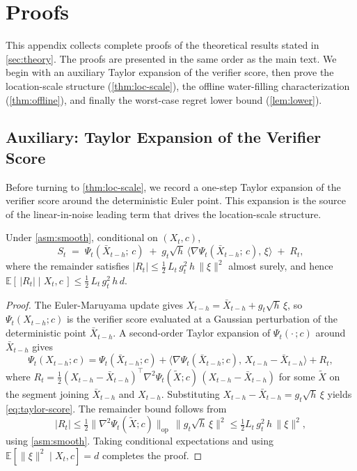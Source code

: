 \section{Proofs}
\label{sec:proofs}
%
This appendix collects complete proofs of the theoretical results stated in \cref{sec:theory}. The proofs are presented in the same order as the main text. We begin with an auxiliary Taylor expansion of the verifier score, then prove the location-scale structure (\cref{thm:loc-scale}), the offline water-filling characterization (\cref{thm:offline}), and finally the worst-case regret lower bound (\cref{lem:lower}).
%
\subsection{Auxiliary: Taylor Expansion of the Verifier Score}
\label{sec:proof-taylor}
%
Before turning to \cref{thm:loc-scale}, we record a one-step Taylor expansion of the verifier score around the deterministic Euler point. This expansion is the source of the linear-in-noise leading term that drives the location-scale structure.
%
\begin{proposition}
\label{prop:taylor}
Under \cref{asm:smooth}, conditional on $(X_t, c)$,
\begin{equation}
  S_t \;=\; \Psi_t(\bar{X}_{t-h};\, c)
        \;+\; g_t\sqrt{h}\,\bigl\langle \nabla\Psi_t(\bar{X}_{t-h};\, c),\, \xi \bigr\rangle
        \;+\; R_t,
  \label{eq:taylor-score}
\end{equation}
where the remainder satisfies $|R_t| \le \tfrac{1}{2}\,L_t\,g_t^2\,h\,\|\xi\|^2$ almost surely, and hence $\mathbb{E}[\,|R_t|\mid X_t, c\,] \le \tfrac{1}{2}\,L_t\,g_t^2\,h\,d$.
\end{proposition}
%
\begin{proof}
The Euler-Maruyama update gives $X_{t-h} = \bar{X}_{t-h} + g_t\sqrt{h}\,\xi$, so $\Psi_t(X_{t-h}; c)$ is the verifier score evaluated at a Gaussian perturbation of the deterministic point $\bar{X}_{t-h}$. A second-order Taylor expansion of $\Psi_t(\cdot\,; c)$ around $\bar{X}_{t-h}$ gives
\[
  \Psi_t(X_{t-h}; c) = \Psi_t(\bar{X}_{t-h}; c) + \bigl\langle \nabla\Psi_t(\bar{X}_{t-h}; c),\, X_{t-h} - \bar{X}_{t-h} \bigr\rangle + R_t,
\]
where $R_t = \tfrac{1}{2}(X_{t-h} - \bar{X}_{t-h})^\top \nabla^2\Psi_t(\widetilde{X}; c)\,(X_{t-h} - \bar{X}_{t-h})$ for some $\widetilde{X}$ on the segment joining $\bar{X}_{t-h}$ and $X_{t-h}$. Substituting $X_{t-h} - \bar{X}_{t-h} = g_t\sqrt{h}\,\xi$ yields \cref{eq:taylor-score}. The remainder bound follows from
\[
  |R_t| \le \tfrac{1}{2}\|\nabla^2\Psi_t(\widetilde{X}; c)\|_{\mathrm{op}}\,\|g_t\sqrt{h}\,\xi\|^2 \le \tfrac{1}{2}L_t\,g_t^2\,h\,\|\xi\|^2,
\]
using \cref{asm:smooth}. Taking conditional expectations and using $\mathbb{E}[\|\xi\|^2 \mid X_t, c] = d$ completes the proof.
\end{proof}
%
